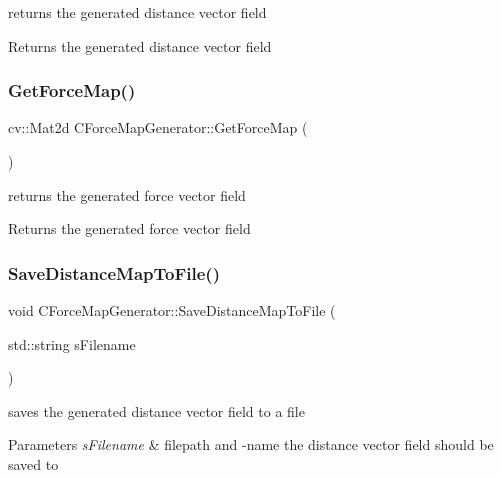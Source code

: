 returns the generated distance vector field \begin{DoxyReturn}{Returns}
the generated distance vector field 
\end{DoxyReturn}
\mbox{\label{classCForceMapGenerator_aee9ad3b402d9275ea734876a8922d616}} 
\subsubsection{\texorpdfstring{Get\+Force\+Map()}{GetForceMap()}}
{\footnotesize\ttfamily cv\+::\+Mat2d C\+Force\+Map\+Generator\+::\+Get\+Force\+Map (\begin{DoxyParamCaption}{ }\end{DoxyParamCaption})\hspace{0.3cm}{\ttfamily [inline]}}

returns the generated force vector field \begin{DoxyReturn}{Returns}
the generated force vector field 
\end{DoxyReturn}
\mbox{\label{classCForceMapGenerator_ad6fc008755aff2eb7ce583cef1e46d6d}} 
\subsubsection{\texorpdfstring{Save\+Distance\+Map\+To\+File()}{SaveDistanceMapToFile()}}
{\footnotesize\ttfamily void C\+Force\+Map\+Generator\+::\+Save\+Distance\+Map\+To\+File (\begin{DoxyParamCaption}\item[{std\+::string}]{s\+Filename }\end{DoxyParamCaption})\hspace{0.3cm}{\ttfamily [inline]}}

saves the generated distance vector field to a file 
\begin{DoxyParams}{Parameters}
{\em s\+Filename} & filepath and -\/name the distance vector field should be saved to \\
\hline
\end{DoxyParams}
\mbox{\label{classCForceMapGenerator_a23f80d23617ecfe5eb3e306293046b53}} 
